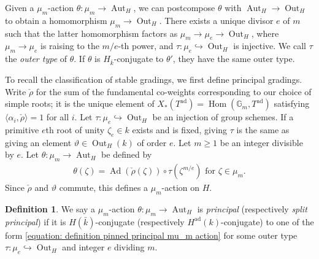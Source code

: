 \documentclass{article} %
\numberwithin{equation}{section}
\theoremstyle{definition}
\newtheorem{definition}[proposition]{Definition}
\newcommand{\G}{\mathbb{G}}
\DeclareMathOperator{\Ad}{Ad}
\DeclareMathOperator{\Hom}{Hom}
\DeclareMathOperator{\Aut}{Aut}
\DeclareMathOperator{\Out}{Out}
\begin{document}
Given a $\mu_m$-action 
$\theta\colon \mu_m\rightarrow \Aut_H$,
we can postcompose $\theta$ with $\Aut_H\rightarrow \Out_H$ to obtain a homomorphism $\mu_m\rightarrow \Out_H$. 
There exists a unique divisor $e$ of $m$ such that the latter homomorphism factors as $\mu_m \rightarrow \mu_e \rightarrow \Out_H$, where $\mu_m\rightarrow \mu_e$ is raising to the $m/e$-th power, and $\tau\colon \mu_e\hookrightarrow \Out_H$ is injective.
We call $\tau$ the \emph{outer type} of $\theta$.
If $\theta$ is $H_{\bar{k}}$-conjugate to $\theta'$, they have the same outer type.

To recall the classification of stable gradings, we first define principal gradings. 
Write $\check\rho$ for the sum of the fundamental co-weights corresponding to our choice of simple roots; it is the unique element of $X_*(T^{\mathrm{ad}}) = \Hom(\G_m,T^{\mathrm{ad}})$ satisfying $\langle \alpha_i, \check{\rho} \rangle = 1$ for all $i$. 
Let $\tau\colon \mu_e\hookrightarrow \Out_H$ be an injection of group schemes.
If a primitive $e$th root of unity $\zeta_e\in k$ exists and is fixed, giving $\tau$ is the same as giving an element $\vartheta\in \Out_H(k)$ of order $e$. 
Let $m\geq 1$ be an integer divisible by $e$.
Let $\theta\colon \mu_m\rightarrow \Aut_H$ be defined by
\begin{align}\label{equation: definition pinned principal mu_m action}
    \theta(\zeta) = \Ad(\check{\rho}(\zeta)) \circ \tau(\zeta^{m/e})  \text{ for }\zeta\in \mu_m.
\end{align}
Since $\check{\rho}$ and $\vartheta$ commute, this defines a $\mu_m$-action on $H$. 


\begin{definition}
 We say a $\mu_m$-action $\theta: \mu_m \to \Aut_H$ is \emph{principal} (respectively \emph{split principal}) if it is $H({\bar{k}})$-conjugate (respectively $H^{\mathrm{ad}}(k)$-conjugate) to one of the form \eqref{equation: definition pinned principal mu_m action} for some outer type $\tau\colon \mu_e\hookrightarrow \Out_H$ and integer $e$ dividing $m$.
\end{definition}
\end{document}
